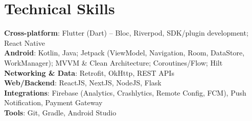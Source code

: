 \section{Technical Skills}
\begin{itemize}[leftmargin=0.15in, label={}]
    \small{\item{
        \textbf{Cross-platform}{: Flutter (Dart) -- Bloc, Riverpod, SDK/plugin development; React Native} \\
        \textbf{Android}{: Kotlin, Java; Jetpack (ViewModel, Navigation, Room, DataStore, WorkManager); MVVM \& Clean Architecture; Coroutines/Flow; Hilt} \\
        \textbf{Networking \& Data}{: Retrofit, OkHttp, REST APIs} \\
        \textbf{Web/Backend}{: ReactJS, NextJS, NodeJS, Flask} \\
        \textbf{Integrations}{: Firebase (Analytics, Crashlytics, Remote Config, FCM), Push Notification, Payment Gateway} \\
        \textbf{Tools}{: Git, Gradle, Android Studio}
    }}
\end{itemize}
